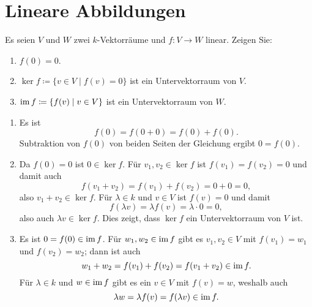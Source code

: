 \section{Lineare Abbildungen}


\begin{question}
 Es seien $V$ und $W$ zwei $k$-Vektorräume und $f \colon V \to W$ linear. Zeigen Sie:
 \begin{enumerate}
  \item
   $f(0) = 0$.
  \item
   $\ker f \coloneqq \{v \in V \mid f(v) = 0\}$ ist ein Untervektorraum von $V$.
  \item
   $\operatorname{im} f \coloneqq \{f(v) \mid v \in V\}$ ist ein Untervektorraum von $W$.
 \end{enumerate}
\end{question}
\begin{solution}
 \begin{enumerate}
  \item
   Es ist
   \[
    f(0) = f(0+0) = f(0)+f(0).
   \]
   Subtraktion von $f(0)$ von beiden Seiten der Gleichung ergibt $0 = f(0)$.
  \item
   Da $f(0) = 0$ ist $0 \in \ker f$. Für $v_1, v_2 \in \ker f$ ist $f(v_1) = f(v_2) = 0$ und damit auch
   \[
    f(v_1+v_2) = f(v_1) + f(v_2) = 0 + 0 = 0,
   \]
   also $v_1 + v_2 \in \ker f$. Für $\lambda \in k$ und $v \in V$ ist $f(v) = 0$ und damit
   \[
    f(\lambda v) = \lambda f(v) = \lambda \cdot 0 = 0,
   \]
   also auch $\lambda v \in \ker f$. Dies zeigt, dass $\ker f$ ein Untervektorraum von $V$ ist.
  \item
   Es ist $0 = f(0) \in \operatorname{im} f$. Für $w_1, w_2 \in \operatorname{im} f$ gibt es $v_1, v_2 \in V$ mit $f(v_1) = w_1$ und $f(v_2) = w_2$; dann ist auch
   \[
    w_1 + w_2 = f(v_1) + f(v_2) = f(v_1 + v_2) \in \operatorname{im} f.
   \]
   Für $\lambda \in k$ und $w \in \operatorname{im} f$ gibt es ein $v \in V$ mit $f(v) = w$, weshalb auch
   \[
    \lambda w = \lambda f(v) = f(\lambda v) \in \operatorname{im} f.
   \]
 \end{enumerate}
\end{solution}



